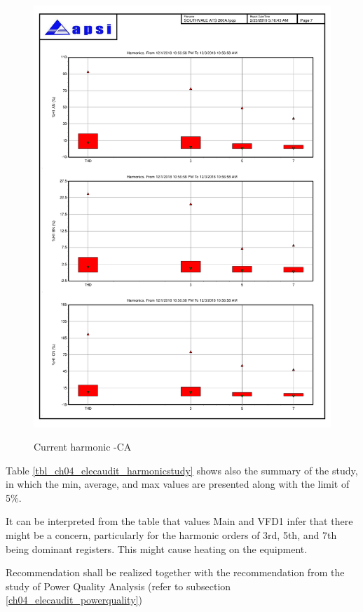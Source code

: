 \begin{figure}
	\includegraphics[width=\textwidth]{figures/fig_ch04_elecaudit_harmonicstudy06} \\
	\caption{Current harmonic -CA}
	\label{fig_ch04_elecaudit_harmonicstudy06} 
\end{figure}

Table \ref{tbl_ch04_elecaudit_harmonicstudy} shows also the summary of the study, in which the min, average, and max values are presented along with the limit of 5\%.




It can be interpreted from the table that values Main and VFD1 infer that there might be a concern, particularly for the harmonic orders of 3rd, 5th, and 7th being dominant registers. This might cause heating on the equipment.

Recommendation shall be realized together with the recommendation from the study of Power Quality Analysis (refer to subsection \ref{ch04_elecaudit_powerquality})



